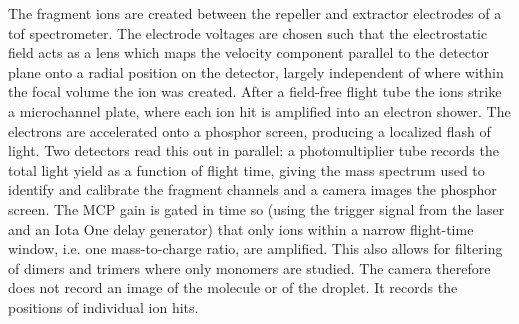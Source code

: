 The fragment ions are created between the repeller and extractor electrodes of a \gls{tof} \cite{eppinkVelocityMapImaging1997} spectrometer. The electrode voltages are chosen such that the electrostatic field acts as a lens which maps the velocity component parallel to the detector plane onto a radial position on the detector, largely independent of where within the focal volume the ion was created.
After a field-free flight tube the ions strike a microchannel plate, where each ion hit is amplified into an electron shower. The electrons are accelerated onto a phosphor screen, producing a localized flash of light. Two detectors read this out in parallel: a photomultiplier tube records the total light yield as a function of flight time, giving the mass spectrum used to identify and calibrate the fragment channels and a camera images the phosphor screen. The MCP gain is gated in time so (using the trigger signal from the laser and an Iota One delay generator) that only ions within a narrow flight-time window, i.e. one mass-to-charge ratio, are amplified. This also allows for filtering of dimers and trimers where only monomers are studied. The camera therefore does not record an image of the molecule or of the droplet. It records the positions of individual ion hits. 

